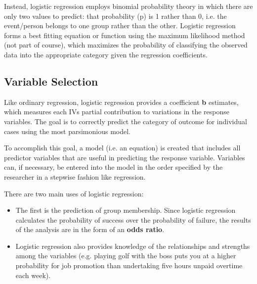 \documentclass[a4paper,12pt]{article}
\begin{document}
Instead, logistic regression employs binomial probability theory in which there are only two values to
predict: that probability (p) is 1 rather than 0, i.e. the event/person belongs to one group
rather than the other. Logistic regression forms a best fitting equation or function using the
maximum likelihood method (not part of course), which maximizes the probability of classifying the observed
data into the appropriate category given the regression coefficients.

\subsection{Variable Selection}
Like ordinary regression, logistic regression provides a coefficient \textbf{b} estimates, which measures
each IVs partial contribution to variations in the response variables. The goal is to correctly predict
the category of outcome for individual cases using the most parsimonious model.

To accomplish this goal, a model (i.e. an equation) is created that includes all predictor variables that are useful in predicting the response variable. Variables can, if necessary, be entered into the model in the order specified by the researcher in a stepwise fashion like regression.

There are two main uses of logistic regression:
\begin{itemize}
\item The first is the prediction of group membership. Since logistic regression calculates the
probability of success over the probability of failure, the results of the analysis are in
the form of an \textbf{odds ratio}.
\item Logistic regression also provides knowledge of the relationships and strengths among
the variables (e.g. playing golf with the boss puts you at a higher probability for job
promotion than undertaking five hours unpaid overtime each week).
\end{itemize}
\end{document}
